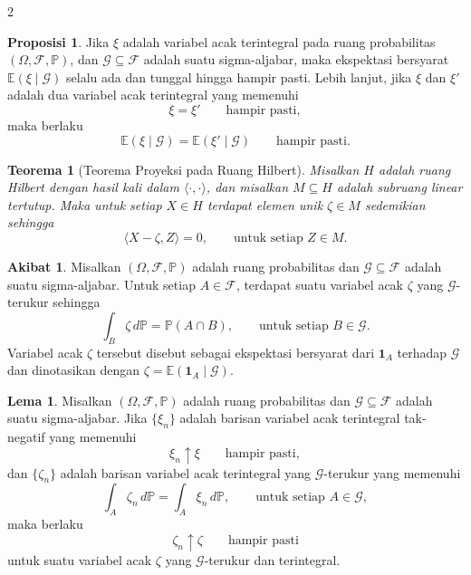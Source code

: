 \documentclass[a4paper,extrafontsizes, 9pt]{memoir}
\theoremstyle{definition}
\newtheorem{lemma}[kalstok]{Lema}
\newtheorem{proposisi}[kalstok]{Proposisi}
\newtheorem{akibat}[kalstok]{Akibat}
\theoremstyle{plain}
\newtheorem{teorema}[kalstok]{Teorema}
\theoremstyle{remark}
\begin{document}
\begin{multicols}{2}
  \begin{proposisi}
    Jika $\xi$ adalah variabel acak terintegral pada ruang probabilitas
    $(\Omega,\mathcal{F},\mathbb{P})$, dan $\mathcal{G}\subseteq\mathcal{F}$ adalah suatu
    sigma-aljabar, maka ekspektasi bersyarat $\mathbb{E}(\xi\mid\mathcal{G})$ selalu ada dan
    tunggal hingga hampir pasti. Lebih lanjut, jika $\xi$ dan $\xi'$ adalah dua variabel acak
    terintegral yang memenuhi
    \[\xi=\xi'\qquad \text{hampir pasti},\]
    maka berlaku
    \[\mathbb{E}(\xi\mid\mathcal{G})=\mathbb{E}(\xi'\mid\mathcal{G})\qquad \text{hampir pasti}.\]
  \end{proposisi}

  \begin{teorema}[Teorema Proyeksi pada Ruang Hilbert]
    Misalkan $H$ adalah ruang Hilbert dengan hasil kali dalam $\langle\cdot,\cdot\rangle$, dan
    misalkan $M\subseteq H$ adalah subruang linear tertutup. Maka untuk setiap $X\in H$ terdapat
    elemen unik $\zeta\in M$ sedemikian sehingga
    \[\langle X-\zeta,Z\rangle=0,\qquad \text{untuk setiap }Z\in M.\]
  \end{teorema}

  \begin{akibat}
    Misalkan $(\Omega,\mathcal{F},\mathbb{P})$ adalah ruang probabilitas dan
    $\mathcal{G}\subseteq\mathcal{F}$ adalah suatu sigma-aljabar. Untuk setiap $A\in\mathcal{F}$,
    terdapat suatu variabel acak $\zeta$ yang $\mathcal{G}$-terukur sehingga
    \[\int_B \zeta\,d\mathbb{P}=\mathbb{P}(A\cap B),\qquad \text{untuk setiap }B\in\mathcal{G}.\]
    Variabel acak $\zeta$ tersebut disebut sebagai ekspektasi bersyarat dari $\mathbf{1}_A$
    terhadap $\mathcal{G}$ dan dinotasikan dengan
    $\zeta=\mathbb{E}(\mathbf{1}_A\mid\mathcal{G}).$
  \end{akibat}

  \begin{lemma}
    Misalkan $(\Omega,\mathcal{F},\mathbb{P})$ adalah ruang probabilitas dan
    $\mathcal{G}\subseteq\mathcal{F}$ adalah suatu sigma-aljabar. Jika $\{\xi_n\}$ adalah
    barisan variabel acak terintegral tak-negatif yang memenuhi
    \[\xi_n\uparrow \xi\qquad \text{hampir pasti},\]
    dan $\{\zeta_n\}$ adalah barisan variabel acak terintegral yang $\mathcal{G}$-terukur yang
    memenuhi
    \[\int_A \zeta_n\,d\mathbb{P}=\int_A \xi_n\,d\mathbb{P},\qquad \text{untuk setiap }A\in\mathcal{G},\]
    maka berlaku
    \[\zeta_n\uparrow \zeta\qquad \text{hampir pasti}\]
    untuk suatu variabel acak $\zeta$ yang $\mathcal{G}$-terukur dan terintegral.
  \end{lemma}


\end{multicols}
\end{document}
